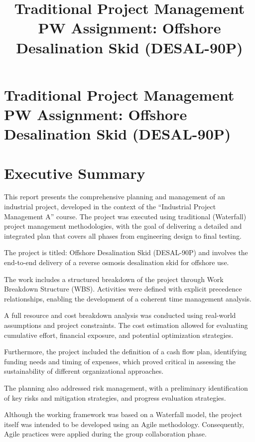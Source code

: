 \documentclass[12pt]{article}
\title{Traditional Project Management PW Assignment: Offshore Desalination Skid (DESAL-90P)}
\author{}
\date{}
\begin{document}
\maketitle

\section{Traditional Project Management PW Assignment: Offshore Desalination Skid (DESAL-90P)}

\section{Executive Summary}

This report presents the comprehensive planning and management of an industrial project, developed in the context of the “Industrial Project Management A” course. The project was executed using traditional (Waterfall) project management methodologies, with the goal of delivering a detailed and integrated plan that covers all phases from engineering design to final testing.

The project is titled: Offshore Desalination Skid (DESAL-90P) and involves the end-to-end delivery of a reverse osmosis desalination skid for offshore use.

The work includes a structured breakdown of the project through Work Breakdown Structure (WBS). Activities were defined with explicit precedence relationships, enabling the development of a coherent time management analysis.

A full resource and cost breakdown analysis was conducted using real-world assumptions and project constraints. The cost estimation allowed for evaluating cumulative effort, financial exposure, and potential optimization strategies.

Furthermore, the project included the definition of a cash flow plan, identifying funding needs and timing of expenses, which proved critical in assessing the sustainability of different organizational approaches.

The planning also addressed risk management, with a preliminary identification of key risks and mitigation strategies, and progress evaluation strategies.

Although the working framework was based on a Waterfall model, the project itself was intended to be developed using an Agile methodology. Consequently, Agile practices were applied during the group collaboration phase.
\end{document}
